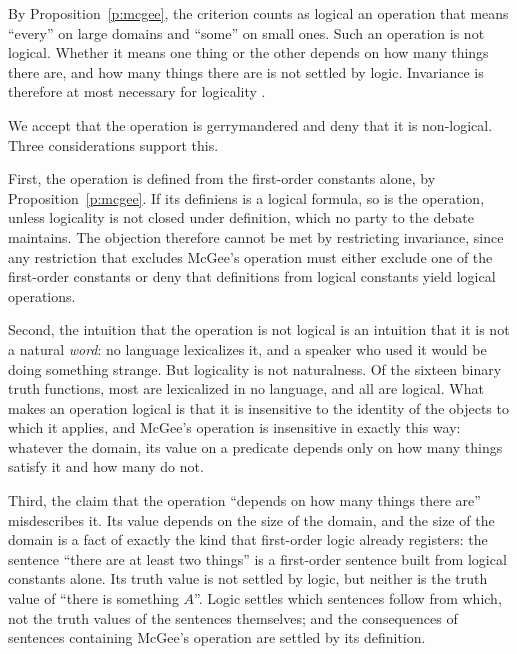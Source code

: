 \documentclass{situationist-preprint}
\begin{document}
\begin{objection}\label{o:mcgee}
By Proposition~\ref{p:mcgee}, the criterion counts as logical an operation that means \enquote{every} on large domains and \enquote{some} on small ones. Such an operation is not logical. Whether it means one thing or the other depends on how many things there are, and how many things there are is not settled by logic. Invariance is therefore at most necessary for logicality \citep{McGee1996}.
\end{objection}

\begin{reply}
We accept that the operation is gerrymandered and deny that it is non-logical. Three considerations support this.

First, the operation is defined from the first-order constants alone, by Proposition~\ref{p:mcgee}. If its definiens is a logical formula, so is the operation, unless logicality is not closed under definition, which no party to the debate maintains. The objection therefore cannot be met by restricting invariance, since any restriction that excludes McGee's operation must either exclude one of the first-order constants or deny that definitions from logical constants yield logical operations.

Second, the intuition that the operation is not logical is an intuition that it is not a natural \emph{word}: no language lexicalizes it, and a speaker who used it would be doing something strange. But logicality is not naturalness. Of the sixteen binary truth functions, most are lexicalized in no language, and all are logical. What makes an operation logical is that it is insensitive to the identity of the objects to which it applies, and McGee's operation is insensitive in exactly this way: whatever the domain, its value on a predicate depends only on how many things satisfy it and how many do not.

Third, the claim that the operation \enquote{depends on how many things there are} misdescribes it. Its value depends on the size of the domain, and the size of the domain is a fact of exactly the kind that first-order logic already registers: the sentence \enquote{there are at least two things} is a first-order sentence built from logical constants alone. Its truth value is not settled by logic, but neither is the truth value of \enquote{there is something $A$}. Logic settles which sentences follow from which, not the truth values of the sentences themselves; and the consequences of sentences containing McGee's operation are settled by its definition.
\end{reply}
\end{document}
